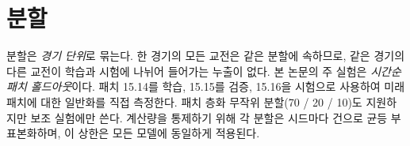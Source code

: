 
\section{분할}
\label{sec:setup-split}

분할은 \emph{경기 단위}로 묶는다. 한 경기의 모든 교전은 같은 분할에 속하므로, 같은 경기의 다른 교전이 학습과 시험에 나뉘어 들어가는 누출이 없다. 본 논문의 주 실험은 \emph{시간순 패치 홀드아웃}이다. 패치 15.14를 학습, 15.15를 검증, 15.16을 시험으로 사용하여 미래 패치에 대한 일반화를 직접 측정한다. 패치 층화 무작위 분할(70 / 20 / 10)도 지원하지만 보조 실험에만 쓴다. 계산량을 통제하기 위해 각 분할은 시드마다 \numSubsample{} 건으로 균등 부표본화하며, 이 상한은 모든 모델에 동일하게 적용된다.
